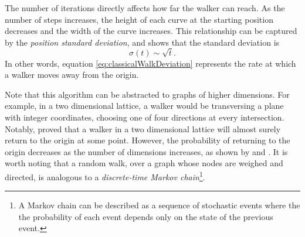 \documentclass[../../dissertation.tex]{subfiles}
\begin{document}
The number of iterations directly affects how far the walker can reach. As the number of
steps increases, the height of each curve at the starting position decreases
and the width of the curve increases. This relationship can be captured by the
\textit{position standard deviation}, and \cite{kpearson1905} shows that the standard
deviation is
\begin{equation}
	\sigma(t) \sim \sqrt{t}.
	\label{eq:classicalWalkDeviation}
\end{equation}
In other words, equation \eqref{eq:classicalWalkDeviation} represents the rate at
which a walker moves away from the origin.\par
Note that this algorithm can be abstracted to graphs of higher dimensions. For
example, in a two dimensional lattice, a walker would be transversing a plane
with integer coordinates, choosing one of four directions at every
intersection. Notably, \cite{polya1921} proved that a walker in a two
dimensional lattice will almost surely return to the origin at some point.
However, the probability of returning to the origin decreases as the number of
dimensions increases, as shown by \cite{montrol1956} and \cite{finch2003}.
It is worth noting that a random walk, over a graph whose nodes are weighed and
directed, is analogous to a \textit{discrete-time Markov chain}\footnote{A
Markov chain can be described as a sequence of stochastic events where the the
probability of each event depends only on the state of the previous
event.}.
\end{document}
